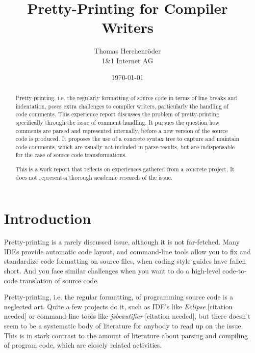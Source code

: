 \documentclass[11pt,a4paper]{article}
\begin{document}
\title{Pretty-Printing for Compiler Writers}
\author{
Thomas Herchenr\"oder\\
1\&1 Internet AG
}

\date{\today}
\maketitle

\begin{abstract} 

Pretty-printing, i.e. the regularly formatting of source code in terms of line
breaks and indentation, poses extra challenges to compiler writers, particularly
the handling of code comments. This experience report discusses the problem of
pretty-printing specifically through the issue of comment handling. It pursues
the question how comments are parsed and represented internally, before a new
version of the source code is produced. It proposes the use of a concrete syntax
tree to capture and maintain code comments, which are usually not included in
parse results, but are indispensable for the case of source code
transformations.

This is a work report that reflects on experiences gathered from a
concrete project. It does not represent a thorough academic research of the
issue.  

\end{abstract}

\section{Introduction} 

Pretty-printing is a rarely discussed issue, although it is not far-fetched.
Many IDEs provide automatic code layout, and command-line tools allow you to fix
and standardize code formatting on source files, when coding style guides have
fallen short. And you face similar challenges when you want to do a high-level
code-to-code translation of source code.

Pretty-printing, i.e. the regular formatting, of programming source code is a neglected art. Quite a few projects do it, such as IDE's like \emph{Eclipse} [citation needed] or command-line tools like \emph{jsbeautifier} [citation needed], but there doesn't seem to be a systematic body of literature for anybody to read up on the issue. This is in stark contrast to the amount of literature about parsing and compiling of program code, which are closely related activities.
\end{document}
